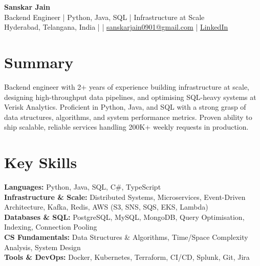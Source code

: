 \documentclass[10pt,letterpaper]{article}
\begin{document}
\begin{center}
    {\Large \textbf{Sanskar Jain}} \\
    Backend Engineer | Python, Java, SQL | Infrastructure at Scale \\
    Hyderabad, Telangana, India \enspace |  \enspace | \enspace
    \href{mailto:sanskarjain0901@gmail.com}{sanskarjain0901@gmail.com} \enspace | \enspace
    \href{https://www.linkedin.com/in/sanskar-jain0901/}{LinkedIn}
\end{center}

\section*{Summary}
Backend engineer with 2+ years of experience building infrastructure at scale, designing high-throughput data pipelines, and optimising SQL-heavy systems at Verisk Analytics. Proficient in Python, Java, and SQL with a strong grasp of data structures, algorithms, and system performance metrics. Proven ability to ship scalable, reliable services handling 200K+ weekly requests in production.

\section*{Key Skills}
\textbf{Languages:} Python, Java, SQL, C\#, TypeScript \\
\textbf{Infrastructure \& Scale:} Distributed Systems, Microservices, Event-Driven Architecture, Kafka, Redis, AWS (S3, SNS, SQS, EKS, Lambda) \\
\textbf{Databases \& SQL:} PostgreSQL, MySQL, MongoDB, Query Optimisation, Indexing, Connection Pooling \\
\textbf{CS Fundamentals:} Data Structures \& Algorithms, Time/Space Complexity Analysis, System Design \\
\textbf{Tools \& DevOps:} Docker, Kubernetes, Terraform, CI/CD, Splunk, Git, Jira
\end{document}
